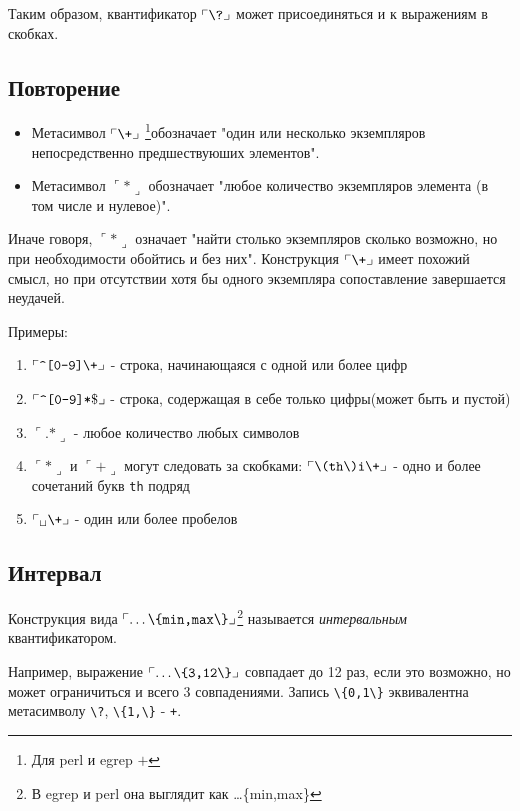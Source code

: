 Таким образом, квантификатор $\ulcorner \verb+\?+ \lrcorner$ может присоединяться и к выражениям в скобках.

\subsection{Повторение}

\begin{itemize}
\item Метасимвол $\ulcorner \verb=\+= \lrcorner$ \footnote{Для perl и egrep $+$}обозначает "один или несколько экземпляров непосредственно предшествуюших элементов".
\item Метасимвол $\ulcorner * \lrcorner$ обозначает "любое количество экземпляров элемента (в том числе и нулевое)".
\end{itemize}

Иначе говоря, $\ulcorner * \lrcorner$ означает "найти столько экземпляров сколько возможно, но при необходимости обойтись и без них". Конструкция $\ulcorner \verb=\+= \lrcorner$ имеет похожий смысл, но при отсутствии хотя бы одного экземпляра сопоставление завершается неудачей.

Примеры:
\begin{enumerate}
\item $\ulcorner \verb=^[0-9]\+= \lrcorner$ - строка, начинающаяся с одной или более цифр 
\item $\ulcorner \verb=^[0-9]*=\$ \lrcorner$ -  строка, содержащая в себе только цифры(может быть и пустой) 
\item $\ulcorner .* \lrcorner$ - любое количество любых символов
\item $\ulcorner * \lrcorner$ и $\ulcorner + \lrcorner$ могут следовать за скобками: $\ulcorner \verb=\(th\)i\+= \lrcorner$ - одно и более сочетаний букв \verb+th+ подряд
\item $\ulcorner _\sqcup \verb=\+= \lrcorner$ - один или более пробелов
\end{enumerate} 

\subsection{Интервал}

Конструкция вида $\ulcorner \ldots \verb+\{min,max\}+ \lrcorner$\footnote{В egrep и perl она выглядит как \dots\{min,max\}} называется \emph{интервальным} квантификатором.

Например, выражение $\ulcorner \ldots \verb+\{3,12\}+ \lrcorner$ совпадает до 12 раз, если это возможно, но может ограничиться и всего 3 совпадениями. Запись \verb+\{0,1\}+ эквивалентна метасимволу \verb+\?+, \verb+\{1,\}+ - \verb=+=.

